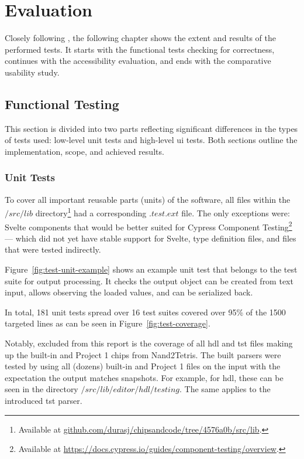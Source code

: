 \chapter{Evaluation}
\label{Evaluation}

Closely following , the following chapter shows the extent and results of the performed tests.
It starts with the functional tests checking for correctness, continues with the accessibility evaluation, and ends with the comparative usability study.

\section{Functional Testing}
\label{Evaluation-Tests}

This section is divided into two parts reflecting significant differences in the types of tests used: low-level unit tests and high-level \gls{ui} tests.
Both sections outline the implementation, scope, and achieved results.

\subsection{Unit Tests}
\label{sec:evaluation-unit-tests}

To cover all important reusable parts (units) of the software, all files within the $/src/lib$ directory\footnote{Available at \href{https://github.com/durasj/chipsandcode/tree/4576a0b/src/lib}{github.com/durasj/chipsandcode/tree/4576a0b/src/lib}.} had a corresponding $.test.ext$ file.
The only exceptions were: Svelte components that would be better suited for Cypress Component Testing\footnote{Available at \url{https://docs.cypress.io/guides/component-testing/overview}.} --- which did not yet have stable support for Svelte, type definition files, and files that were tested indirectly.

Figure~\ref{fig:test-unit-example} shows an example unit test that belongs to the test suite for output processing.
It checks the output object can be created from text input, allows observing the loaded values, and can be serialized back.

In total, 181 unit tests spread over 16 test suites covered over 95\% of the 1500 targeted lines as can be seen in Figure~\ref{fig:test-coverage}.

Notably, excluded from this report is the coverage of all \gls{hdl} and \gls{tst} files making up the built-in and Project 1 chips from Nand2Tetris.
The built parsers were tested by using all (dozens) built-in and Project 1 files on the input with the expectation the output matches snapshots.
For example, for \gls{hdl}, these can be seen in the directory $/src/lib/editor/hdl/testing$.
The same applies to the introduced \gls{tst} parser.

